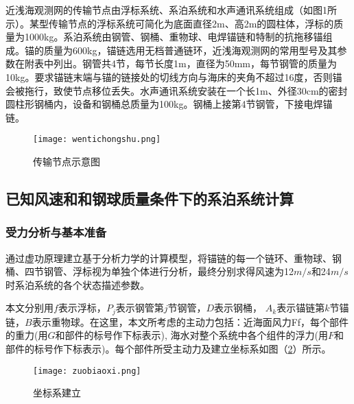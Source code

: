 \documentclass[withoutpreface,bwprint]{cumcmthesis} %
\begin{document}
\par 近浅海观测网的传输节点由浮标系统、系泊系统和水声通讯系统组成（如图1所示）。某型传输节点的浮标系统可简化为底面直径2m、高2m的圆柱体，浮标的质量为1000kg。系泊系统由钢管、钢桶、重物球、电焊锚链和特制的抗拖移锚组成。锚的质量为600kg，锚链选用无档普通链环，近浅海观测网的常用型号及其参数在附表中列出。钢管共4节，每节长度1m，直径为50mm，每节钢管的质量为10kg。要求锚链末端与锚的链接处的切线方向与海床的夹角不超过16度，否则锚会被拖行，致使节点移位丢失。水声通讯系统安装在一个长1m、外径30cm的密封圆柱形钢桶内，设备和钢桶总质量为100kg。钢桶上接第4节钢管，下接电焊锚链。
\begin{figure}[h]
\small
\centering
\texttt{[image: wentichongshu.png]}
\caption{传输节点示意图} \label{fig:wentichongshu}
\end{figure}



\subsection{已知风速和和钢球质量条件下的系泊系统计算}
\subsubsection{受力分析与基本准备}
\par 通过虚功原理建立基于分析力学的计算模型，将锚链的每一个链环、重物球、钢桶、四节钢管、浮标视为单独个体进行分析，最终分别求得风速为12$m/s$和24$m/s$时系泊系统的各个状态描述参数。

\par 本文分别用$f$表示浮标，$P_j$表示钢管第$j$节钢管，$D$表示钢桶， $A_k$表示锚链第$k$节锚链，$B$表示重物球。在这里，本文所考虑的主动力包括：近海面风力Ff，每个部件的重力(用$G$和部件的标号作下标表示), 海水对整个系统中各个组件的浮力(用$F$和部件的标号作下标表示)。每个部件所受主动力及建立坐标系如图（\ref{fig:zuobiaoxi}）所示。

\begin{figure}[!htpb]
\small
\centering
\texttt{[image: zuobiaoxi.png]}
\caption{坐标系建立} \label{fig:zuobiaoxi}
\end{figure}
\end{document}
